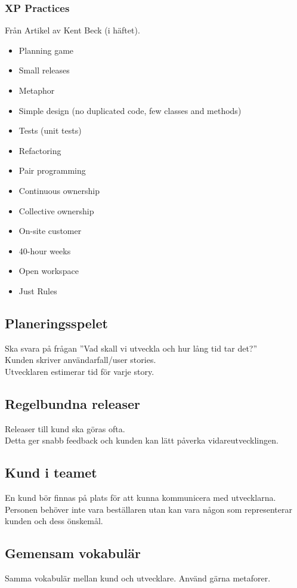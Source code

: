 \documentclass[a4paper]{article}
\begin{document}
\subsubsection{XP Practices}
Från Artikel av Kent Beck (i häftet).
\begin{itemize}
\item{Planning game}
\item{Small releases}
\item{Metaphor}
\item{Simple design (no duplicated code, few classes and methods)}
\item{Tests (unit tests)}
\item{Refactoring}
\item{Pair programming}
\item{Continuous ownership}
\item{Collective ownership}
\item{On-site customer}
\item{40-hour weeks}
\item{Open workspace}
\item{Just Rules}
\end{itemize}
\subsection{Planeringsspelet}
Ska svara på frågan ''Vad skall vi utveckla och hur lång tid tar det?'' \\
Kunden skriver användarfall/user stories. \\
Utvecklaren estimerar tid för varje story.

\subsection{Regelbundna releaser}
Releaser till kund ska göras ofta. \\
Detta ger snabb feedback och kunden kan lätt påverka vidareutvecklingen.
\subsection{Kund i teamet}
En kund bör finnas på plats för att kunna kommunicera med utvecklarna. Personen behöver inte vara beställaren utan kan vara någon som representerar kunden och dess önskemål. 
\subsection{Gemensam vokabulär}
Samma vokabulär mellan kund och utvecklare. Använd gärna metaforer. 
\end{document}
